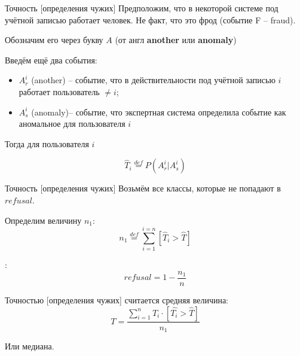 \begin{frame}{Точность [определения чужих]}
	\small
	Предположим, что в некоторой системе под учётной записью 
	работает  человек.
	Не факт, что это фрод (событие F -- fraud).
	
	Обозначим его через букву $A$ (от англ \textbf{another} или \textbf{anomaly})
	
	Введём ещё два события:
	\begin{itemize}
		\item $A_r^i$ (another) -- событие, что в действительности под учётной записью $i$
		работает пользователь $\neq i$;
		\item $A_s^i$ (anomaly)-- событие, что экспертная система определила событие
		как аномальное для пользователя $i$
	\end{itemize}

	Тогда 	
	для пользователя $i$	

	\begin{equation}
	\hat T_i \stackrel{def}{=} P (A_r^i | A_s^i)
	\end{equation}
\end{frame}

\begin{frame}{Точность [определения чужих]}
	\small
	Возьмём все классы, которые не попадают в $refusal$.
	
	Определим величину $n_1$:
	\begin{equation}
	n_1 \stackrel{def}{=} \sum_{i=1}^{i=n} \left[\hat T_i > \hat T \right]	
	\end{equation}
	
	:
	\begin{equation}
	refusal = 1 - \frac{n_1}{n}
	\end{equation}
	
	Точностью [определения чужих] считается средняя величина:
	\begin{equation}\label{eq:ueba_presicion_def}
	T = \frac{\sum_{i=1}^{n} T_i \cdot \left [\hat{T_i} > \hat T \right]}{n_1} 
	\end{equation}
	
	Или медиана.
\end{frame}

